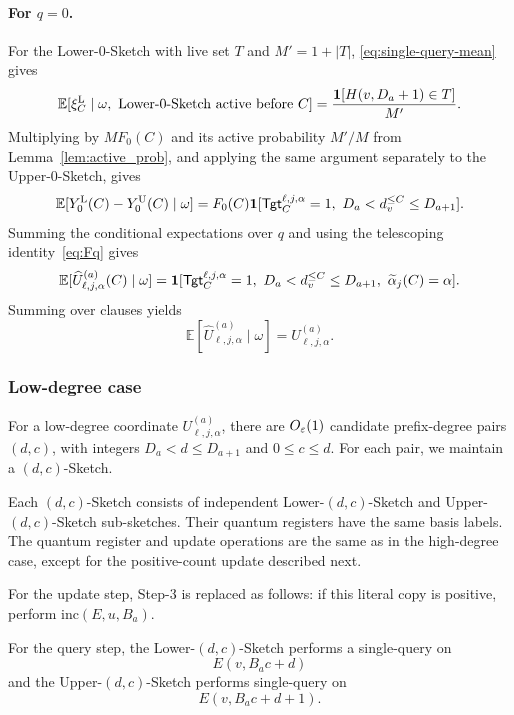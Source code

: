 \paragraph{For $q=0$.}
For the Lower-$0$-Sketch with live set $T$ and $M'=1+|T|$, \eqref{eq:single-query-mean} gives
\[
\mathbb E[\xi_C^{\mathrm L}\mid\omega,\ \text{Lower-$0$-Sketch active before }C]
=\frac{\1[H(v,D_a+1)\in T]}{M'}.
\]
Multiplying by $MF_0(C)$ and its active probability $M'/M$ from Lemma~\ref{lem:active_prob}, and applying the same argument separately to the Upper-$0$-Sketch, gives
\begin{equation}\label{0q}
\mathbb E[Y_0^{\mathrm L}(C)-Y_0^{\mathrm U}(C)\mid\omega]
=F_0(C)\mathbf 1[\mathsf{Tgt}^{\ell,j,\alpha}_{C}=1,\ D_a<d_v^{\le C}\le D_{a+1}].
\end{equation}
Summing the conditional expectations over $q$ and using the telescoping identity~\eqref{eq:Fq} gives
\begin{equation}\label{eq:one-endpoint-high-coordinate}
\mathbb E[\widehat U^{(a)}_{\ell,j,\alpha}(C)\mid\omega]
=\1[\mathsf{Tgt}^{\ell,j,\alpha}_{C}=1,\ D_a<d_v^{\le C}\le D_{a+1},\ \widetilde\alpha_j(C)=\alpha].
\end{equation}
Summing over clauses yields
\[
\mathbb E[\widehat U^{(a)}_{\ell,j,\alpha}\mid\omega]
=U^{(a)}_{\ell,j,\alpha}.
\]

\subsubsection{Low-degree case} \label{Sec:lowdegree}

For a low-degree coordinate $U^{(a)}_{\ell,j,\alpha}$, there are $O_\varepsilon(1)$ candidate prefix-degree pairs $(d,c)$, with integers $D_a<d\le D_{a+1}$ and $0\le c\le d$. For each pair, we maintain a $(d,c)$-Sketch.

Each $(d,c)$-Sketch consists of independent Lower-$(d,c)$-Sketch and Upper-$(d,c)$-Sketch sub-sketches. Their quantum registers have the same basis labels. The quantum register and update operations are the same as in the high-degree case, except for the positive-count update described next.

For the update step, Step-3 is replaced as follows: if this literal copy is positive, perform
$
      \mathrm{inc}(E,u,B_a).
    $

For the query step, the Lower-$(d,c)$-Sketch performs a single-query on \[
E(v, B_a c+d )
\] and the Upper-$(d,c)$-Sketch performs single-query on \[
E(v, B_a c+d+1 ).
\] 

